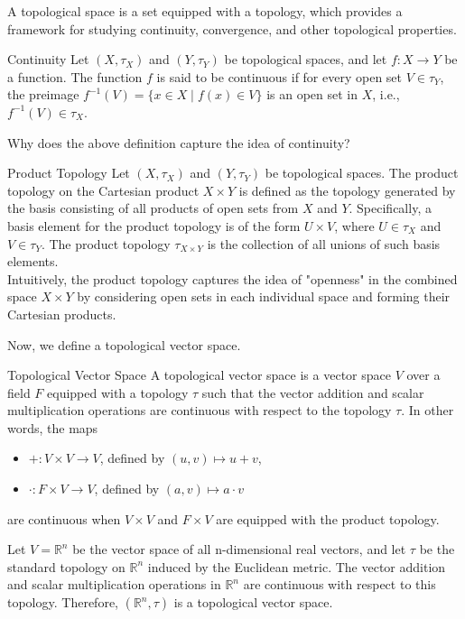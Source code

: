 \documentclass[openany]{book}
\begin{document}
A topological space is a set equipped with a topology, which provides a framework for studying continuity, convergence, and other topological properties. \\
\begin{mydefinition}{Continuity}
Let $(X, \tau_X)$ and $(Y, \tau_Y)$ be topological spaces, and let $f: X \to Y$ be a function. The function $f$ is said to be continuous if for every open set $V \in \tau_Y$, the preimage $f^{-1}(V) = \{x \in X \mid f(x) \in V\}$ is an open set in $X$, i.e., $f^{-1}(V) \in \tau_X$.
\end{mydefinition}
Why does the above definition capture the idea of continuity? 
\begin{mydefinition}{Product Topology}
Let $(X, \tau_X)$ and $(Y, \tau_Y)$ be topological spaces. The product topology on the Cartesian product $X \times Y$ is defined as the topology generated by the basis consisting of all products of open sets from $X$ and $Y$. Specifically, a basis element for the product topology is of the form $U \times V$, where $U \in \tau_X$ and $V \in \tau_Y$. The product topology $\tau_{X \times Y}$ is the collection of all unions of such basis elements. \\
Intuitively, the product topology captures the idea of "openness" in the combined space $X \times Y$ by considering open sets in each individual space and forming their Cartesian products.
\end{mydefinition}
Now, we define a topological vector space.
\begin{mydefinition}{Topological Vector Space}
A topological vector space is a vector space $V$ over a field $F$ equipped with a topology $\tau$ such that the vector addition and scalar multiplication operations are continuous with respect to the topology $\tau$. In other words, the maps
\begin{itemize}
    \item $+: V \times V \to V$, defined by $(u, v) \mapsto u + v$,
    \item $\cdot: F \times V \to V$, defined by $(a, v) \mapsto a \cdot v$
\end{itemize}
are continuous when $V \times V$ and $F \times V$ are equipped with the product topology. 
\end{mydefinition}
\begin{example}
Let $V = \mathbb{R}^n$ be the vector space of all n-dimensional real vectors, and let $\tau$ be the standard topology on $\mathbb{R}^n$ induced by the Euclidean metric. The vector addition and scalar multiplication operations in $\mathbb{R}^n$ are continuous with respect to this topology. Therefore, $(\mathbb{R}^n, \tau)$ is a topological vector space.
\end{example}
\end{document}
